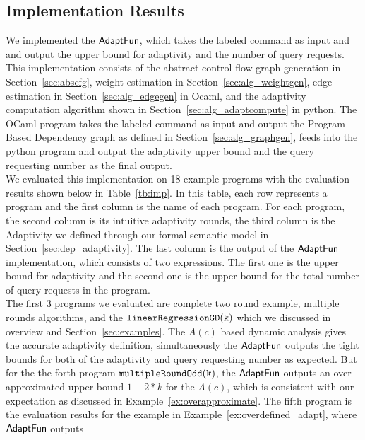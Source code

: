 \subsection{Implementation Results}
We implemented the $\textsf{AdaptFun}$, which takes the labeled command as input and 
and output the upper bound for adaptivity and the number of query requests.
This implementation consists of the 
abstract control flow graph generation in Section~\ref{sec:abscfg}, weight estimation in Section~\ref{sec:alg_weightgen},
edge estimation in Section~\ref{sec:alg_edgegen} in Ocaml, 
and the adaptivity computation algorithm shown in Section~\ref{sec:alg_adaptcompute} in python.
The OCaml program takes the labeled command as input and output the Program-Based Dependency graph as defined in Section~\ref{sec:alg_graphgen},
feeds into the python program and output the adaptivity upper bound and the query requesting number as the final output.
\\
We evaluated this implementation on 18 example programs with the evaluation results shown below in Table~\ref{tb:imp}.
In this table, each row represents a program and
the first column is the name of each program.
For each program, the second column is its intuitive adaptivity rounds,
the third column is the Adaptivity we defined through our formal semantic model in Section~\ref{sec:dep_adaptivity}.
The last column is the output of the $\textsf{AdaptFun}$ implementation, which consists of two expressions.
The first one is the upper bound for adaptivity and the second one is the 
upper bound for the total number of query requests in the program.
\\
The first 3 programs we evaluated are complete 
two round example, multiple rounds algorithms, 
and the  $ \mathtt{linearRegressionGD(k)}$ which we discussed in overview and Section~\ref{sec:examples}.
The $A(c)$ based dynamic analysis gives the accurate adaptivity definition, 
simultaneously the $\textsf{AdaptFun}$ outputs the tight bounds for both of the adaptivity and query requesting number as expected.
But for the the forth program $\mathtt{multipleRoundOdd(k)}$, the $\textsf{AdaptFun}$ outputs an over-approximated upper bound $1 + 2*k$ for the $A(c)$, which is consistent with our expectation as discussed in Example~\ref{ex:overapproximate}. 
The fifth program is the evaluation results for the example in Example~\ref{ex:overdefined_adapt}, where $\textsf{AdaptFun}$ outputs
